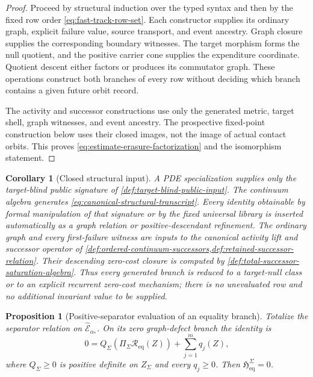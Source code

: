 \documentclass[11pt]{article}
\numberwithin{section}{part}
\theoremstyle{plain}
\newtheorem{proposition}[proposition]{Proposition}
\newtheorem{corollary}[corollary]{Corollary}
\theoremstyle{definition}
\theoremstyle{remark}
\begin{document}
\begin{proof}
Proceed by structural induction over the typed syntax and then by the fixed row
order \eqref{eq:fast-track-row-set}.  Each constructor supplies its ordinary
graph, explicit failure value, source transport, and event ancestry.  Graph
closure supplies the corresponding boundary witnesses.  The target morphism
forms the null quotient, and the positive carrier cone supplies the
expenditure coordinate.  Quotient descent either factors or produces its
commutator graph.  These operations construct both branches of every row
without deciding which branch contains a given future orbit record.

The activity and successor constructions use only the generated metric,
target shell, graph witnesses, and event ancestry.  The prospective
fixed-point construction below uses their closed images, not the image of
actual contact orbits.  This proves \eqref{eq:estimate-erasure-factorization}
and the isomorphism statement.
\end{proof}

\begin{corollary}[Closed structural input]
\label{cor:closed-structural-input}
A PDE specialization supplies only the target-blind public signature of
\cref{def:target-blind-public-input}.  The continuum algebra generates
\eqref{eq:canonical-structural-transcript}.  Every identity obtainable by
formal manipulation of that signature or by the fixed universal library is
inserted automatically as a graph relation or positive-descendant refinement.
The ordinary graph and every first-failure witness are inputs to the canonical
activity lift and successor operator of
\cref{def:ordered-continuum-successors,def:retained-successor-relation}.  Their
descending zero-cost closure is computed by
\cref{def:total-successor-saturation-algebra}.  Thus every generated branch is
reduced to a target-null class or to an explicit recurrent zero-cost mechanism;
there is no unevaluated row and no additional invariant value to be supplied.
\end{corollary}

\begin{proposition}[Positive-separator evaluation of an equality branch]
\label{prop:positive-equality-separator}
Totalize the separator relation on
\(\widehat{\mathcal E}_{\alpha_*}\).  On its zero graph-defect branch the
identity is
\begin{equation}
 \label{eq:positive-equality-separator}
 0=Q_\Sigma\!\left(
    \Pi_\Sigma\mathscr R_{\mathrm{eq}}(Z)\right)
   +\sum_{j=1}^{m}q_j(Z),
\end{equation}
where \(Q_\Sigma\ge0\) is positive definite on \(Z_\Sigma\) and every
\(q_j\ge0\).  Then
\(\mathfrak H_{\mathrm{eq}}^{\Sigma}=0\).
\end{proposition}
\end{document}
